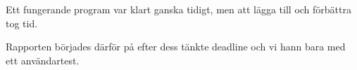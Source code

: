 Ett fungerande program var klart ganska tidigt,
men att lägga till och förbättra tog tid.

Rapporten börjades därför på efter dess tänkte deadline
och vi hann bara med ett användartest.

